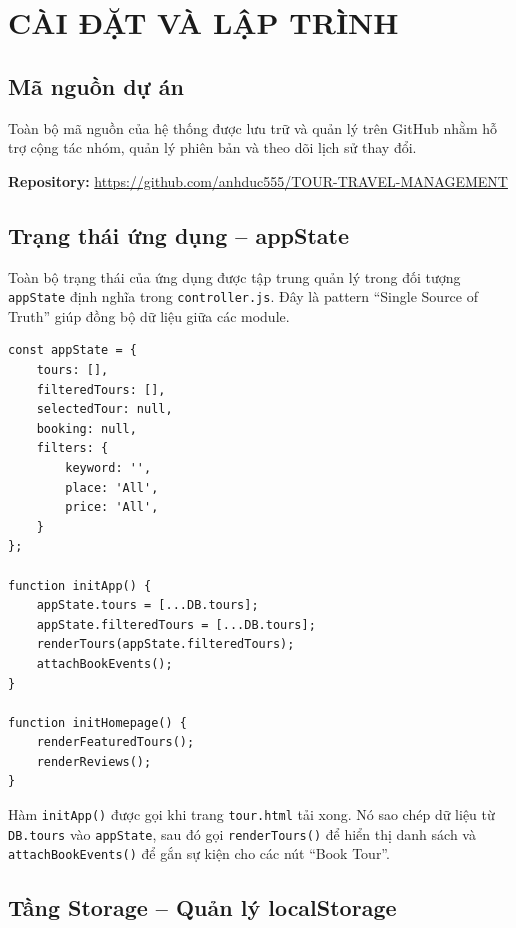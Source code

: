 \documentclass[12pt,a4paper]{article}
\begin{document}
\section{CÀI ĐẶT VÀ LẬP TRÌNH}
\subsection{Mã nguồn dự án}

Toàn bộ mã nguồn của hệ thống được lưu trữ và quản lý trên GitHub nhằm hỗ trợ cộng tác nhóm, quản lý phiên bản và theo dõi lịch sử thay đổi.

\textbf{Repository:}
\url{https://github.com/anhduc555/TOUR-TRAVEL-MANAGEMENT}

\subsection{Trạng thái ứng dụng -- appState}

Toàn bộ trạng thái của ứng dụng được tập trung quản lý trong đối tượng \texttt{appState} định nghĩa trong \texttt{controller.js}. Đây là pattern ``Single Source of Truth'' giúp đồng bộ dữ liệu giữa các module.

\begin{lstlisting}[caption={controller.js -- Khởi tạo trạng thái ứng dụng}]
const appState = {
    tours: [],
    filteredTours: [],
    selectedTour: null,
    booking: null,
    filters: {
        keyword: '',
        place: 'All',
        price: 'All',
    }
};

function initApp() {
    appState.tours = [...DB.tours];
    appState.filteredTours = [...DB.tours];
    renderTours(appState.filteredTours);
    attachBookEvents();
}

function initHomepage() {
    renderFeaturedTours();
    renderReviews();
}
\end{lstlisting}

Hàm \texttt{initApp()} được gọi khi trang \texttt{tour.html} tải xong. Nó sao chép dữ liệu từ \texttt{DB.tours} vào \texttt{appState}, sau đó gọi \texttt{renderTours()} để hiển thị danh sách và \texttt{attachBookEvents()} để gắn sự kiện cho các nút ``Book Tour''.
\subsection{Tầng Storage -- Quản lý localStorage}
\end{document}
